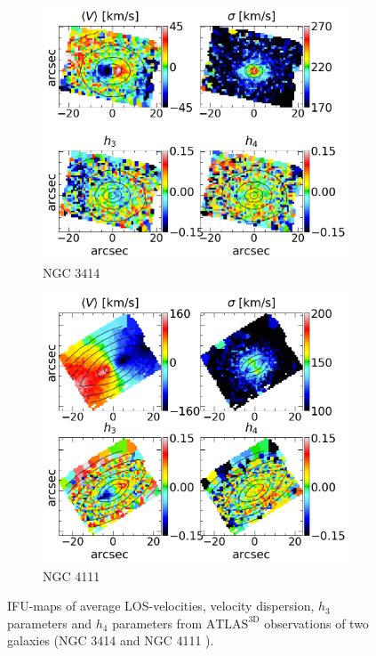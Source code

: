\documentclass[english, oneside]{HYgradu}
\begin{document}
\begin{figure}
	\centering
	\begin{subfigure}[b]{0.49\textwidth}
		\includegraphics[width=\textwidth]{NGC3414_r6_voronoi.png}
		\caption{NGC 3414}
	\end{subfigure}
	\begin{subfigure}[b]{0.49\textwidth}
		\includegraphics[width=\textwidth]{NGC4111_r1_voronoi.png}
		\caption{NGC 4111}
	\end{subfigure}
	\caption{IFU-maps of average LOS-velocities, velocity dispersion, $h_3$ parameters and $h_4$ parameters from $\mathrm{ATLAS^{3D}}$ observations of two galaxies (NGC 3414 \citep{Emsellem2004} and NGC 4111 \citep{Cappellari2011}).}
\end{figure}
\end{document}
